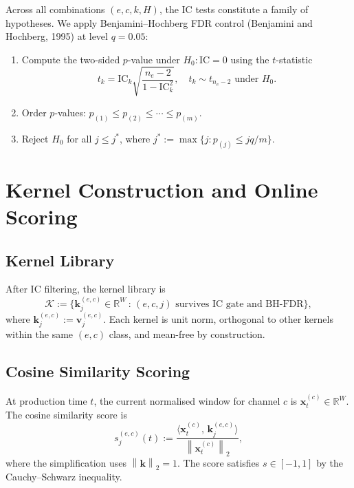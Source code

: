 \documentclass[11pt,a4paper]{article}
\theoremstyle{definition}
\theoremstyle{plain}
\newcommand{\R}{\mathbb{R}}
\newcommand{\bvec}[1]{\mathbf{#1}}
\newcommand{\norm}[1]{\left\lVert #1 \right\rVert}
\newcommand{\inner}[2]{\langle #1,\, #2 \rangle}
\begin{document}
Across all combinations $(e, c, k, H)$, the IC tests constitute a family
of hypotheses. We apply Benjamini--Hochberg FDR control (Benjamini and
Hochberg, 1995) at level $q = 0.05$:
\begin{enumerate}
    \item Compute the two-sided $p$-value under $H_0\colon \mathrm{IC} = 0$
          using the $t$-statistic
          \begin{equation}
              t_k = \mathrm{IC}_k
                    \sqrt{\frac{n_e - 2}{1 - \mathrm{IC}_k^2}},
              \quad t_k \sim t_{n_e-2} \text{ under } H_0.
              \label{eq:ic_tstat}
          \end{equation}
    \item Order $p$-values: $p_{(1)} \leq p_{(2)} \leq \cdots \leq p_{(m)}$.
    \item Reject $H_0$ for all $j \leq j^*$, where
          $j^* := \max\{j : p_{(j)} \leq jq/m\}$.
\end{enumerate}

\section{Kernel Construction and Online Scoring}
\label{sec:online}

\subsection{Kernel Library}

After IC filtering, the kernel library is
\begin{equation}
    \mathcal{K} :=
    \bigl\{\bvec{k}^{(e,c)}_j \in \R^W \,:\,
    \text{$(e,c,j)$ survives IC gate and BH-FDR}\bigr\},
    \label{eq:kernel_library}
\end{equation}
where $\bvec{k}^{(e,c)}_j := \bvec{v}^{(e,c)}_j$. Each kernel is unit
norm, orthogonal to other kernels within the same $(e,c)$ class, and
mean-free by construction.

\subsection{Cosine Similarity Scoring}

At production time $t$, the current normalised window for channel $c$ is
$\bvec{x}^{(c)}_t \in \R^W$. The cosine similarity score is
\begin{equation}
    s^{(e,c)}_j(t) :=
    \frac{\inner{\bvec{x}^{(c)}_t}{\bvec{k}^{(e,c)}_j}}
         {\norm{\bvec{x}^{(c)}_t}_2},
    \label{eq:cosine_score}
\end{equation}
where the simplification uses $\norm{\bvec{k}}_2 = 1$. The score satisfies
$s \in [-1, 1]$ by the Cauchy--Schwarz inequality.
\end{document}
